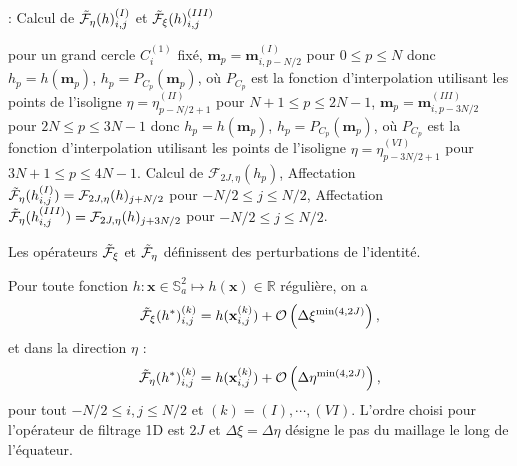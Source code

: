 \begin{center}
\begin{minipage}[H]{12cm}
  \begin{algorithm}[H]
    \caption{: Calcul de $\tilde{\mathcal{F}}_{\eta}(h)_{i,j}^{(I)}$ et $\tilde{\mathcal{F}}_{\xi}(h)_{i,j}^{(III)}$}\label{alg:ftreta}
    \begin{algorithmic}[1]
    \State pour un grand cercle $C_i^{(1)}$ fixé,
             \State  $\mathbf{m}_p = \mathbf{m}_{i,p-N/2}^{(I)}$ pour $0  \leq p \leq N$ donc $h_p = h(\mathbf{m}_p)$,
             \State $h_p = P_{C_p}(\mathbf{m}_p)$, où $P_{C_p}$ est la fonction d'interpolation utilisant les points de l'isoligne $\eta = \eta^{(II)}_{p-N/2+1}$ pour $N+1 \leq p \leq 2N-1$,
             \State  $\mathbf{m}_p = \mathbf{m}_{i,p-3N/2}^{(III)}$ pour $2N  \leq p \leq 3N-1$ donc $h_p = h(\mathbf{m}_p)$,
             \State $h_p = P_{C_p}(\mathbf{m}_p)$, où $P_{C_p}$ est la fonction d'interpolation utilisant les points de l'isoligne $\eta = \eta^{(VI)}_{p-3N/2+1}$ pour $3N+1 \leq p \leq 4N-1$.
            \EndFor
    \State Calcul de $\mathcal{F}_{2J,\eta}(h_p)$,
    \State Affectation $\tilde{\mathcal{F}}_{\eta}(h_{i,j}^{(I)}) = \mathcal{F}_{2J,\eta}(h)_{j+N/2}$ pour $-N/2 \leq j \leq N/2$,
    \State Affectation $\tilde{\mathcal{F}}_{\eta}(h_{i,j}^{(III)}) = \mathcal{F}_{2J,\eta}(h)_{j+3N/2}$ pour $-N/2 \leq j \leq N/2$.
    \EndFor
    \end{algorithmic}
    \end{algorithm}
\end{minipage}
\end{center}
Les opérateurs $\tilde{\mathcal{F}}_{\xi}$ et $\tilde{\mathcal{F}}_{\eta}$ définissent des perturbations de l'identité.
\begin{proposition}
Pour toute fonction $h : \mathbf{x} \in \mathbb{S}_a^2 \mapsto h(\mathbf{x}) \in \mathbb{R}$ régulière, on a 
\begin{equation}
\tilde{\mathcal{F}}_{\xi}(h^*)_{i,j}^{(k)} = h(\mathbf{x}_{i,j}^{(k)}) + \mathcal{O}\left( \Delta \xi^{\min(4,2J)} \right),
\label{eq:consistance_fxi}
\end{equation}
et dans la direction $\eta$ :
\begin{equation}
\tilde{\mathcal{F}}_{\eta}(h^*)_{i,j}^{(k)} = h(\mathbf{x}_{i,j}^{(k)}) + \mathcal{O}\left( \Delta \eta^{\min(4,2J)} \right),
\label{eq:consistance_feta}
\end{equation}
pour tout $-N/2 \leq i,j \leq N/2$ et $(k) = (I), \cdots , (VI)$. L'ordre choisi pour l'opérateur de filtrage 1D est $2J$ et $\Delta \xi = \Delta \eta$ désigne le pas du maillage le long de l'équateur.
\label{prop:consistance_ftrdir}
\end{proposition}

